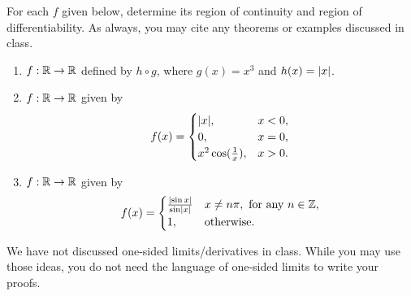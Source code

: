 \documentclass[12pt]{article}
\begin{document}
\begin{problem}
    For each $f$ given below, determine its region of continuity and region of differentiability.
    As always, you may cite any theorems or examples discussed in class.
    \begin{enumerate}[label=(\alph*)]
        \item $f : \mathbb{R} \to \mathbb{R}$ defined by $h \circ g$, where $g(x) = x^{3}$ and $h(x) = \abs{x}$.
        \item $f : \mathbb{R} \to \mathbb{R}$ given by \[
            f(x) = \begin{cases}
                \abs{x}, & x < 0, \\
                0, & x = 0, \\
                x^{2} \cos(\frac{1}{x}), & x > 0.
            \end{cases}
        \]
        \item $f : \mathbb{R} \to \mathbb{R}$ given by \[
            f(x) = \begin{cases}
                \frac{\abs{\sin x}}{\sin \abs{x}} & x \neq n \pi, \text{ for any } n \in \Z, \\
                1, & \text{otherwise}.
            \end{cases}
        \]
    \end{enumerate}
\end{problem}
\begin{rem}
    We have not discussed one-sided limits/derivatives in class.
    While you may use those ideas, you do not need the language of one-sided limits to write your proofs.
\end{rem}
\end{document}
